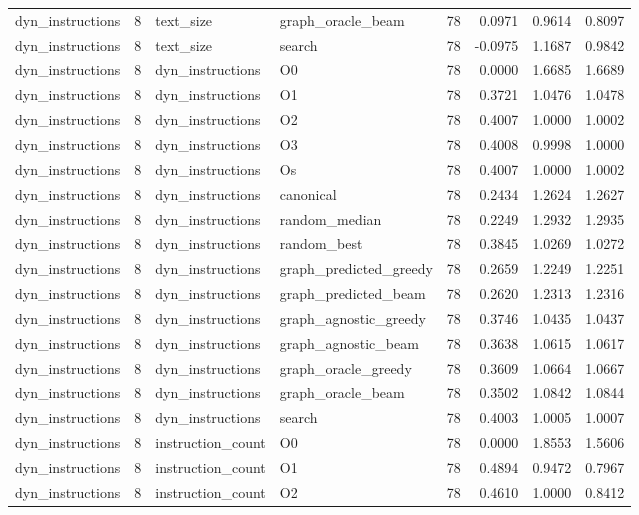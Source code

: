 \begin{table}[t]
\begin{tabular}{lrllrrrr}
dyn\_instructions & 8 & text\_size & graph\_oracle\_beam & 78 & 0.0971 & 0.9614 & 0.8097 \\
dyn\_instructions & 8 & text\_size & search & 78 & -0.0975 & 1.1687 & 0.9842 \\
dyn\_instructions & 8 & dyn\_instructions & O0 & 78 & 0.0000 & 1.6685 & 1.6689 \\
dyn\_instructions & 8 & dyn\_instructions & O1 & 78 & 0.3721 & 1.0476 & 1.0478 \\
dyn\_instructions & 8 & dyn\_instructions & O2 & 78 & 0.4007 & 1.0000 & 1.0002 \\
dyn\_instructions & 8 & dyn\_instructions & O3 & 78 & 0.4008 & 0.9998 & 1.0000 \\
dyn\_instructions & 8 & dyn\_instructions & Os & 78 & 0.4007 & 1.0000 & 1.0002 \\
dyn\_instructions & 8 & dyn\_instructions & canonical & 78 & 0.2434 & 1.2624 & 1.2627 \\
dyn\_instructions & 8 & dyn\_instructions & random\_median & 78 & 0.2249 & 1.2932 & 1.2935 \\
dyn\_instructions & 8 & dyn\_instructions & random\_best & 78 & 0.3845 & 1.0269 & 1.0272 \\
dyn\_instructions & 8 & dyn\_instructions & graph\_predicted\_greedy & 78 & 0.2659 & 1.2249 & 1.2251 \\
dyn\_instructions & 8 & dyn\_instructions & graph\_predicted\_beam & 78 & 0.2620 & 1.2313 & 1.2316 \\
dyn\_instructions & 8 & dyn\_instructions & graph\_agnostic\_greedy & 78 & 0.3746 & 1.0435 & 1.0437 \\
dyn\_instructions & 8 & dyn\_instructions & graph\_agnostic\_beam & 78 & 0.3638 & 1.0615 & 1.0617 \\
dyn\_instructions & 8 & dyn\_instructions & graph\_oracle\_greedy & 78 & 0.3609 & 1.0664 & 1.0667 \\
dyn\_instructions & 8 & dyn\_instructions & graph\_oracle\_beam & 78 & 0.3502 & 1.0842 & 1.0844 \\
dyn\_instructions & 8 & dyn\_instructions & search & 78 & 0.4003 & 1.0005 & 1.0007 \\
dyn\_instructions & 8 & instruction\_count & O0 & 78 & 0.0000 & 1.8553 & 1.5606 \\
dyn\_instructions & 8 & instruction\_count & O1 & 78 & 0.4894 & 0.9472 & 0.7967 \\
dyn\_instructions & 8 & instruction\_count & O2 & 78 & 0.4610 & 1.0000 & 0.8412 \\

\end{tabular}
\end{table}
